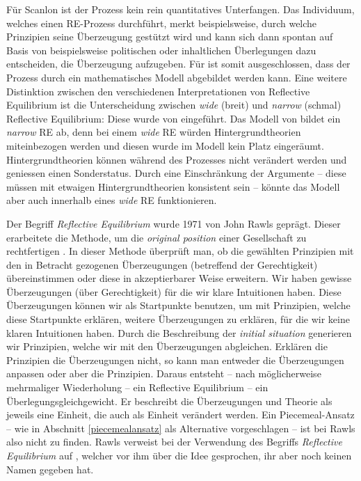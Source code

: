 \documentclass{article}
\begin{document}
Für Scanlon ist der Prozess kein rein quantitatives Unterfangen. Das Individuum, welches einen RE-Prozess durchführt, merkt beispielsweise, durch welche Prinzipien seine Überzeugung gestützt wird und kann sich dann spontan auf Basis von beispielsweise politischen oder inhaltlichen Überlegungen dazu entscheiden, die Überzeugung aufzugeben. Für \citeauthor{freeman_rawls_2002} ist somit ausgeschlossen, dass der Prozess durch ein mathematisches Modell abgebildet werden kann. \parencite[vgl.][S.~148]{freeman_rawls_2002}
Eine weitere Distinktion zwischen den verschiedenen Interpretationen von Reflective Equilibrium ist die Unterscheidung zwischen \textit{wide} (breit) und \textit{narrow} (schmal) Reflective Equilibrium: Diese wurde von \cite{daniels_wide_1996} eingeführt. Das Modell von \citeauthor{beisbart_making_2021} bildet ein \textit{narrow} RE ab, denn bei einem \textit{wide} RE würden Hintergrundtheorien miteinbezogen werden und diesen wurde im Modell kein Platz eingeräumt. Hintergrundtheorien können während des Prozesses nicht verändert werden und geniessen einen Sonderstatus. Durch eine Einschränkung der Argumente -- diese müssen mit etwaigen Hintergrundtheorien konsistent sein -- könnte das Modell aber auch innerhalb eines \textit{wide} RE funktionieren. \parencite[vgl.][S.~459]{beisbart_making_2021}

Der Begriff \textit{Reflective Equilibrium} wurde 1971 von John Rawls geprägt. Dieser erarbeitete die Methode, um die \textit{original position} einer Gesellschaft zu rechtfertigen \parencite[vgl.][]{rawls_theory_1971}. In dieser Methode überprüft man, ob die gewählten Prinzipien mit den in Betracht gezogenen Überzeugungen (betreffend der Gerechtigkeit) übereinstimmen oder diese in akzeptierbarer Weise erweitern. Wir haben gewisse Überzeugungen (über Gerechtigkeit) für die wir klare Intuitionen haben. Diese Überzeugungen können wir als Startpunkte benutzen, um mit Prinzipien, welche diese Startpunkte erklären, weitere Überzeugungen zu erklären, für die wir keine klaren Intuitionen haben. Durch die Beschreibung der \textit{initial situation} generieren wir Prinzipien, welche wir mit den Überzeugungen abgleichen. Erklären die Prinzipien die Überzeugungen nicht, so kann man entweder die Überzeugungen anpassen oder aber die Prinzipien. Daraus entsteht -- nach möglicherweise mehrmaliger Wiederholung -- ein Reflective Equilibrium -- ein Überlegungsgleichgewicht. Er beschreibt die Überzeugungen und Theorie als jeweils eine Einheit, die auch als Einheit verändert werden. Ein Piecemeal-Ansatz -- wie in Abschnitt \ref{piecemealansatz} als Alternative vorgeschlagen -- ist bei Rawls also nicht zu finden. Rawls verweist bei der Verwendung des Begriffs \textit{Reflective Equilibrium} auf \cite{goodman_fact_1983}, welcher vor ihm über die Idee gesprochen, ihr aber noch keinen Namen gegeben hat. \parencite[vgl.][S.~20]{rawls_theory_1971}
\end{document}
